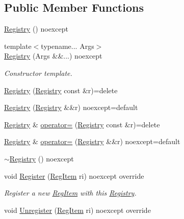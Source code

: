 \subsection*{Public Member Functions}
\begin{DoxyCompactItemize}
\item 
\hyperlink{classregistry_1_1Registry_af21c2f4bde1c2fdcd4d77da773ec570c}{Registry} () noexcept
\item 
{\footnotesize template$<$typename... Args$>$ }\\\hyperlink{classregistry_1_1Registry_ae4e32a61c71b9014a96505346147924a}{Registry} (Args \&\&...) noexcept
\begin{DoxyCompactList}\small\item\em Constructor template. \end{DoxyCompactList}\item 
\hyperlink{classregistry_1_1Registry_a94a766d55d2bacfbf8eda23efb742d92}{Registry} (\hyperlink{classregistry_1_1Registry}{Registry} const \&r)=delete
\item 
\hyperlink{classregistry_1_1Registry_ae2d265e4cbbdda86f81c631ebb91f865}{Registry} (\hyperlink{classregistry_1_1Registry}{Registry} \&\&r) noexcept=default
\item 
\hyperlink{classregistry_1_1Registry}{Registry} \& \hyperlink{classregistry_1_1Registry_a64553c5b4bc597a69876b614fe1eeab3}{operator=} (\hyperlink{classregistry_1_1Registry}{Registry} const \&r)=delete
\item 
\hyperlink{classregistry_1_1Registry}{Registry} \& \hyperlink{classregistry_1_1Registry_a3faca0c879dc001f097ba069c13cf6a1}{operator=} (\hyperlink{classregistry_1_1Registry}{Registry} \&\&r) noexcept=default
\item 
\hyperlink{classregistry_1_1Registry_aea422f465bd0d2dba7e08f68b1dfc724}{$\sim$\+Registry} () noexcept
\item 
void \hyperlink{classregistry_1_1Registry_a2d44265acc3db0fdea9df1a67a14206c}{Register} (\hyperlink{classregistry_1_1RegItem}{Reg\+Item} ri) noexcept override
\begin{DoxyCompactList}\small\item\em Register a new \hyperlink{classregistry_1_1RegItem}{Reg\+Item} with this \hyperlink{classregistry_1_1Registry}{Registry}. \end{DoxyCompactList}\item 
void \hyperlink{classregistry_1_1Registry_ad020a0ef83e4a29064ad95baf2e0796f}{Unregister} (\hyperlink{classregistry_1_1RegItem}{Reg\+Item} ri) noexcept override

\end{DoxyCompactItemize}
